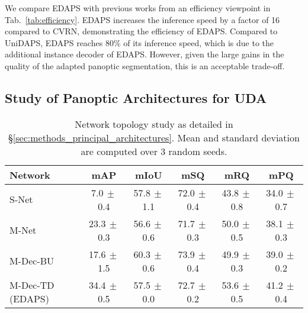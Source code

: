 \documentclass[10pt,twocolumn,letterpaper]{article}
\newcommand{\spm}[1]{\tiny{$\,\pm$#1}}
\begin{document}
We compare EDAPS with previous works from an efficiency viewpoint in Tab.~\ref{tab:efficiency}. EDAPS increases the inference speed by a factor of 16 compared to CVRN, demonstrating the efficiency of EDAPS. Compared to UniDAPS, EDAPS reaches 80\% of its inference speed, which is due to the additional instance decoder of EDAPS. However, given the large gains in the quality of the adapted panoptic segmentation, this is an acceptable trade-off.


\subsection{Study of Panoptic Architectures for UDA}
\label{sec:network_study}
\begingroup
\setlength{\tabcolsep}{3.5pt} 
\renewcommand{\arraystretch}{1.3}
\begin{table}
\centering
\caption{
Network topology study as detailed in \S\ref{sec:methods_principal_architectures}. Mean and standard deviation are computed over 3 random seeds.
}
\footnotesize
\setlength\tabcolsep{1px}
\begin{tabular}{l @{\quad} ccccc}

\toprule 

Network
& mAP & mIoU & mSQ & mRQ & mPQ \\

\midrule

S-Net
& 7.0\spm{0.4} 
& 57.8\spm{1.1}  
& 72.0\spm{0.4} 
& 43.8\spm{0.8} 
& 34.0\spm{0.7} 
\\

M-Net
& 23.3\spm{0.3} 
& 56.6\spm{0.6} 
& 71.7\spm{0.3} 
& 50.0\spm{0.5} 
& 38.1\spm{0.3} 
\\

M-Dec-BU      
& 17.6\spm{1.5} 
& 60.3\spm{0.6} 
& 73.9\spm{0.4} 
& 49.9\spm{0.3} 
& 39.0\spm{0.2} 
\\

M-Dec-TD (EDAPS)
& 34.4\spm{0.5} 
& 57.5\spm{0.0} 
& 72.7\spm{0.2} 
& 53.6\spm{0.5} 
& 41.2\spm{0.4} 
\\
\bottomrule
\end{tabular}



 \label{tab:network_study}
\end{table}
\endgroup
\end{document}
